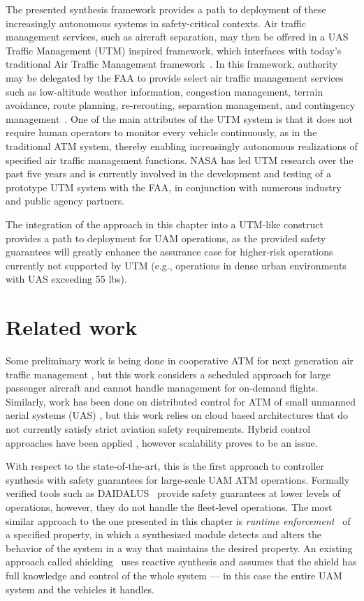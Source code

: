 The presented synthesis framework provides a path to deployment of these increasingly autonomous systems in safety-critical contexts.  Air traffic management services, such as aircraft separation, may then be offered in a UAS Traffic Management (UTM) inspired framework, which interfaces with today’s traditional Air Traffic Management framework~\cite{PRKRJJ2016}. In this framework,  authority may be delegated by the FAA to provide select air traffic management services such as low-altitude weather information, congestion management, terrain avoidance, route planning, re-rerouting, separation management, and contingency management~\cite{MBYDLGMC2018,NCDDASC2018}.  One of the main attributes of the UTM system is that it does not require human operators to monitor every vehicle continuously, as in the traditional ATM system, thereby enabling increasingly autonomous realizations of specified air traffic management functions.  NASA has led UTM research over the past five years and is currently involved in the development and testing of a prototype UTM system with the FAA, in conjunction with numerous industry and public agency partners.  

The integration of the approach in this chapter into a UTM-like construct provides a path to deployment for UAM operations, as the provided safety guarantees will greatly enhance the assurance case for higher-risk operations currently not supported by UTM (e.g., operations in dense urban environments with UAS exceeding 55 lbs).


\section{Related work}

 Some preliminary work is being done in cooperative ATM for next generation air traffic management \cite{prevot2005co}, but this work considers a scheduled approach for large passenger aircraft and cannot handle management for on-demand flights. Similarly, work has been done on distributed control for ATM of small unmanned aerial systems (UAS) \cite{FSLLK2015}, but this work relies on cloud based architectures that do not currently satisfy strict aviation safety requirements.  Hybrid control approaches have been applied \cite{tomlin1996hybrid}, however scalability proves to be an issue.


With respect to the state-of-the-art, this is the first approach to
controller synthesis with safety guarantees for large-scale UAM ATM operations. Formally verified tools such as DAIDALUS~\cite{Daidalus} provide safety guarantees at lower levels of operations, however, they do not handle the fleet-level operations. The most similar approach to the one presented in this chapter is \emph{runtime enforcement}~\cite{Falcone10,Schneider00} of a specified property, in which a synthesized module detects and alters the behavior of the system in a way that maintains the desired property. An existing approach called shielding~\cite{BloemKKW15,KonighoferABHKT17} uses reactive synthesis and assumes that the shield has full knowledge and control of the whole system --- in this case the entire UAM system and the vehicles it handles. 

